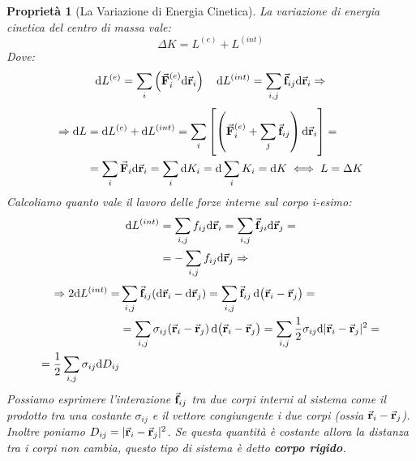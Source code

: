 \documentclass{article}
\newtheorem{property}{Proprietà}[section]
\newcommand{\note}{\noindent {\quad \bf \underline{Osservazione:}} \quad}
\newcommand{\then}{\ensuremath{\Rightarrow}}
\renewcommand{\r}{\va{r}}
\newcommand{\F}{\va{F}}
\newcommand{\f}{\va{f}}
\begin{document}
\begin{property}[La Variazione di Energia Cinetica]
La variazione di energia cinetica del centro di massa vale:
\[\Delta K=L^{(e)}+L^{(int)}\]
Dove:
\begin{equation}
    \dd L^{(e)}=\sum_i\left(\F_i^{(e)}\dd\r_i\right)\quad\dd L^{(int)}=\sum_{i,j}\f_{ij}\dd\r_i\then
\end{equation}
\begin{equation}
\begin{split}
    \then\dd L&=\dd L^{(e)}+\dd L^{(int)}=\sum_i\left[\left(\F_i^{(e)}+\sum_j\f_{ij}\right)\dd\r_i\right]=\\
    &=\sum_i\F_i\dd\r_i=\sum_i\dd K_i=\dd\sum_iK_i=\dd K\iff L=\Delta K
\end{split}
\end{equation}
Calcoliamo quanto vale il lavoro delle forze interne sul corpo i-esimo:
\begin{equation}
\begin{split}
    \dd L^{(int)}&=\sum_{i,j}f_{ij}\dd\r_i=\sum_{i,j}\f_{ji}\dd\r_j=\\
    &=-\sum_{i,j}f_{ij}\dd\r_j\then 
\end{split}
\end{equation}
\begin{equation}
\begin{split}
    \then 2\dd L^{(int)}=&\sum_{i,j}\f_{ij}(\dd\r_i-\dd\r_j)=\sum_{i,j}\f_{ij}\dd(\r_i-\r_j)=\\
    &=\sum_{i,j}\sigma_{ij}(\r_i-\r_j)\dd(\r_i-\r_j)=\sum_{i,j}\frac{1}{2}\sigma_{ij}\dd|\r_i-\r_j|^2=\\
    =\frac{1}{2}\sum_{i,j}\sigma_{ij}\dd D_{ij}
\end{split}    
\end{equation}
\note Possiamo esprimere l'interazione $\f_{ij}$ tra due corpi interni al sistema come il prodotto tra una costante $\sigma_{ij}$ e il vettore congiungente i due corpi (ossia $\r_i-\r_j$). Inoltre poniamo $D_{ij}=|\r_i-\r_j|^2$. Se questa quantità è costante allora la distanza tra i corpi non cambia, questo tipo di sistema è detto \textbf{corpo rigido}.
\end{property}
\end{document}
